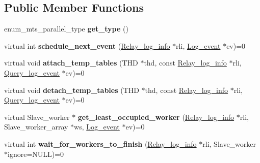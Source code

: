 \subsection*{Public Member Functions}
\begin{DoxyCompactItemize}
\item 
\mbox{\label{classMts__submode_a8669d5047ddf9668c5d6d5d6977cb371}} 
enum\+\_\+mts\+\_\+parallel\+\_\+type {\bfseries get\+\_\+type} ()
\item 
\mbox{\label{classMts__submode_ab3cfb824fb23b2ac1ee7d2d2b8845193}} 
virtual int {\bfseries schedule\+\_\+next\+\_\+event} (\mbox{\hyperlink{classRelay__log__info}{Relay\+\_\+log\+\_\+info}} $\ast$rli, \mbox{\hyperlink{classLog__event}{Log\+\_\+event}} $\ast$ev)=0
\item 
\mbox{\label{classMts__submode_a4b330d64e341d662c2194f3c132e33a8}} 
virtual void {\bfseries attach\+\_\+temp\+\_\+tables} (T\+HD $\ast$thd, const \mbox{\hyperlink{classRelay__log__info}{Relay\+\_\+log\+\_\+info}} $\ast$rli, \mbox{\hyperlink{classQuery__log__event}{Query\+\_\+log\+\_\+event}} $\ast$ev)=0
\item 
\mbox{\label{classMts__submode_ab6ae736d1ecbcc67a737ceb6f853a135}} 
virtual void {\bfseries detach\+\_\+temp\+\_\+tables} (T\+HD $\ast$thd, const \mbox{\hyperlink{classRelay__log__info}{Relay\+\_\+log\+\_\+info}} $\ast$rli, \mbox{\hyperlink{classQuery__log__event}{Query\+\_\+log\+\_\+event}} $\ast$ev)=0
\item 
\mbox{\label{classMts__submode_a3ed9f6d210fe4c04b6601da18479d0d3}} 
virtual Slave\+\_\+worker $\ast$ {\bfseries get\+\_\+least\+\_\+occupied\+\_\+worker} (\mbox{\hyperlink{classRelay__log__info}{Relay\+\_\+log\+\_\+info}} $\ast$rli, Slave\+\_\+worker\+\_\+array $\ast$ws, \mbox{\hyperlink{classLog__event}{Log\+\_\+event}} $\ast$ev)=0
\item 
\mbox{\label{classMts__submode_ad8a8cfbf7228863fdcac5ddfd1478b85}} 
virtual int {\bfseries wait\+\_\+for\+\_\+workers\+\_\+to\+\_\+finish} (\mbox{\hyperlink{classRelay__log__info}{Relay\+\_\+log\+\_\+info}} $\ast$rli, Slave\+\_\+worker $\ast$ignore=N\+U\+LL)=0
\end{DoxyCompactItemize}
